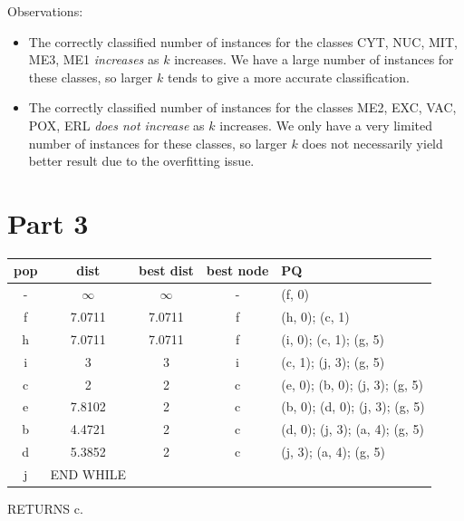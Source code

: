 \documentclass[12pt]{article}
\begin{document}
Observations:
\begin{itemize}
	\item The correctly classified number of instances for the classes CYT, NUC, MIT, ME3, ME1 \textit{increases} as $k$ increases.
	\subitem We have a large number of instances for these classes, so larger $k$ tends to give a more accurate classification.
	\item The correctly classified number of instances for the classes ME2, EXC, VAC, POX, ERL \textit{does not increase} as $k$ increases.
	\subitem We only have a very limited number of instances for these classes, so larger $k$ does not necessarily yield better result due to the overfitting issue.
\end{itemize}
\section*{Part 3}
\begin{center}
	\begin{tabular}{ccccl}
\hline
pop&	dist&	best dist&	best node&	PQ\\
\hline
-	&$\infty$		&$\infty$			&- &			(f, 0)\\
f	&7.0711&	7.0711&		f&			(h, 0); (c, 1)\\
h	&7.0711&	7.0711&		f&			(i, 0); (c, 1); (g, 5)\\
i	&3	&	3	&		i	&		(c, 1); (j, 3); (g, 5)\\
c	&2	&	2	&		c	&		(e, 0); (b, 0); (j, 3); (g, 5)\\
e	&7.8102	&2	&		c	&		(b, 0); (d, 0); (j, 3); (g, 5)\\
b	&4.4721	&2	&		c	&		(d, 0); (j, 3); (a, 4); (g, 5)\\
d	&5.3852	&2	&		c	&		(j, 3); (a, 4); (g, 5)\\
j   & END WHILE \\
\hline
\end{tabular}
\end{center}
RETURNS c.
\end{document}
